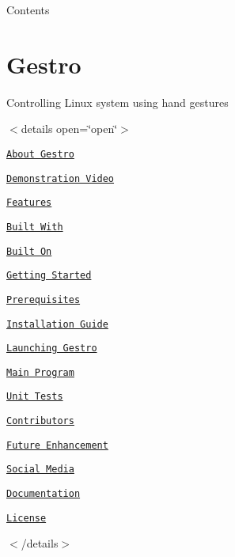Contents

\section*{Gestro}

\href{https://github.com/RandomGuy-coder/Gestro}{\tt }

Controlling Linux system using hand gestures



     



$<$details open=\char`\"{}open\char`\"{}$>$


\begin{DoxyEnumerate}
\item \href{#About-Gestro}{\tt About Gestro} 
\begin{DoxyItemize}
\item \href{#Demonstration-Video}{\tt Demonstration Video} 
\item \href{#Features}{\tt Features} 
\item \href{#Built-With}{\tt Built With} 
\item \href{#Built-On}{\tt Built On} 
\end{DoxyItemize}
\item \href{#Getting-Started}{\tt Getting Started} 
\begin{DoxyItemize}
\item \href{#Prerequisites}{\tt Prerequisites} 
\item \href{#Installation-Guide}{\tt Installation Guide} 
\end{DoxyItemize}
\item \href{#Launching-Gestro}{\tt Launching Gestro} 
\begin{DoxyItemize}
\item \href{#Main-Program}{\tt Main Program} 
\item \href{#Unit-Tests}{\tt Unit Tests} 
\end{DoxyItemize}


\item \href{#Contributors}{\tt Contributors} 
\item \href{#Future-Enhancement}{\tt Future Enhancement} 
\item \href{#Social-Media}{\tt Social Media} 
\item \href{#Documentation}{\tt Documentation} 
\item \href{#License}{\tt License} 
\end{DoxyEnumerate}$<$/details$>$


